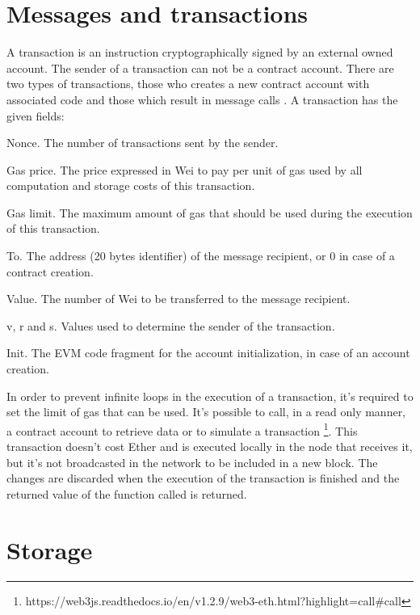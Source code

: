 \documentclass[
    article, 
    12pt,				%
	oneside,			%
	a4paper,			%
	chapter=TITLE,		%
	section=TITLE,		%
	english,			%
	english,				%
	sumario=tradicional
]{abntex2}
\begin{document}
\section{Messages and transactions}

A transaction is an instruction cryptographically signed by an external owned account. 
The sender of a transaction can not be a contract account.
There are two types of transactions, those who creates a new contract account with associated code and those which result in message calls \cite{wood_ethereum_2021}.
A transaction has the given fields:

\begin{alineas}
  \item Nonce. The number of transactions sent by the sender.
  \item Gas price. The price expressed in Wei to pay per unit of gas used by all computation and storage costs of this transaction.
  \item Gas limit. The maximum amount of gas that should be used during the execution of this transaction.
  \item To. The address (20 bytes identifier) of the message recipient, or 0 in case of a contract creation.
  \item Value. The number of Wei to be transferred to the message recipient.
  \item v, r and s. Values used to determine the sender of the transaction.
  \item Init. The EVM code fragment for the account initialization, in case of an account creation.
\end{alineas}

In order to prevent infinite loops in the execution of a transaction, it's required to set the limit of gas that can be used.
It's possible to call, in a read only manner, a contract account to retrieve data or to simulate a transaction \footnote{https://web3js.readthedocs.io/en/v1.2.9/web3-eth.html?highlight=call\#call}.
This transaction doesn't cost Ether and is executed locally in the node that receives it, but it's not broadcasted in the network to be included in a new block.
The changes are discarded when the execution of the transaction is finished and the returned value of the function called is returned.

\section{Storage}
\end{document}
